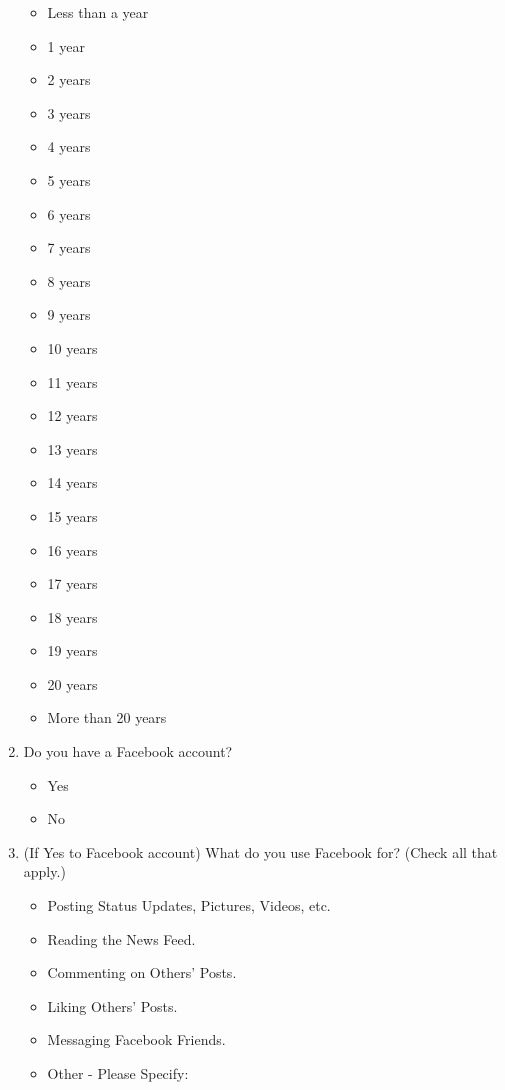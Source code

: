 \begin{appendices}
\begin{enumerate}
\begin{itemize}
\item Less than a year
\item 1 year
\item 2 years
\item 3 years
\item 4 years
\item 5 years
\item 6 years
\item 7 years
\item 8 years
\item 9 years
\item 10 years
\item 11 years
\item 12 years
\item 13 years
\item 14 years
\item 15 years
\item 16 years
\item 17 years
\item 18 years
\item 19 years
\item 20 years
\item More than 20 years
\end{itemize}
\item Do you have a Facebook account?
\begin{itemize}
\item Yes
\item No
\end{itemize}
\item (If Yes to Facebook account) What do you use Facebook for? (Check all that apply.)
\begin{itemize}
\item Posting Status Updates, Pictures, Videos, etc.
\item Reading the News Feed.
\item Commenting on Others' Posts.
\item Liking Others' Posts.
\item Messaging Facebook Friends.
\item Other - Please Specify:
\end{itemize}


\end{enumerate}
\end{appendices}
